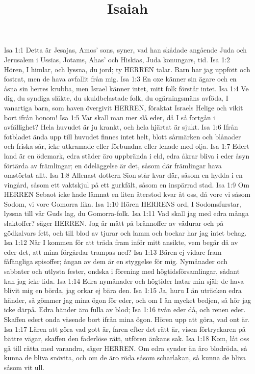 

\title{Isaiah}

Isa 1:1  Detta är Jesajas, Amos' sons, syner, vad han skådade angående Juda och Jerusalem i Ussias, Jotams, Ahas' och Hiskias, Juda konungars, tid.
Isa 1:2  Hören, I himlar, och lyssna, du jord; ty HERREN talar. Barn har jag uppfött och fostrat, men de hava avfallit från mig.
Isa 1:3  En oxe känner sin ägare och en åsna sin herres krubba, men Israel känner intet, mitt folk förstår intet.
Isa 1:4  Ve dig, du syndiga släkte, du skuldbelastade folk, du ogärningsmäns avföda, I vanartiga barn, som haven övergivit HERREN, föraktat Israels Helige och vikit bort ifrån honom!
Isa 1:5  Var skall man mer slå eder, då I så fortgån i avfällighet? Hela huvudet är ju krankt, och hela hjärtat är sjukt.
Isa 1:6  Ifrån fotbladet ända upp till huvudet finnes intet helt, blott sårmärken och blånader och friska sår, icke utkramade eller förbundna eller lenade med olja.
Isa 1:7  Edert land är en ödemark, edra städer äro uppbrända i eld, edra åkrar bliva i eder åsyn förtärda av främlingar; en ödeläggelse är det, såsom där främlingar hava omstörtat allt.
Isa 1:8  Allenast dottern Sion står kvar där, såsom en hydda i en vingård, såsom ett vaktskjul på ett gurkfält, såsom en inspärrad stad.
Isa 1:9  Om HERREN Sebaot icke hade lämnat en liten återstod kvar åt oss, då vore vi såsom Sodom, vi vore Gomorra lika.
Isa 1:10  Hören HERRENS ord, I Sodomsfurstar, lyssna till vår Guds lag, du Gomorra-folk.
Isa 1:11  Vad skall jag med edra många slaktoffer? säger HERREN. Jag är mätt på brännoffer av vädurar och på gödkalvars fett, och till blod av tjurar och lamm och bockar har jag intet behag.
Isa 1:12  När I kommen för att träda fram inför mitt ansikte, vem begär då av eder det, att mina förgårdar trampas ned?
Isa 1:13  Bären ej vidare fram fåfängliga spisoffer; ångan av dem är en styggelse för mig. Nymånader och sabbater och utlysta fester, ondska i förening med högtidsförsamlingar, sådant kan jag icke lida.
Isa 1:14  Edra nymånader och högtider hatar min själ; de hava blivit mig en börda, jag orkar ej bära den.
Isa 1:15  Ja, huru I än uträcken edra händer, så gömmer jag mina ögon för eder, och om I än mycket bedjen, så hör jag icke därpå. Edra händer äro fulla av blod;
Isa 1:16  tvån eder då, och renen eder. Skaffen edert onda väsende bort ifrån mina ögon. Hören upp att göra, vad ont är.
Isa 1:17  Lären att göra vad gott är, faren efter det rätt är, visen förtryckaren på bättre vägar, skaffen den faderlöse rätt, utfören änkans sak.
Isa 1:18  Kom, låt oss gå till rätta med varandra, säger HERREN. Om edra synder än äro blodröda, så kunna de bliva snövita, och om de äro röda såsom scharlakan, så kunna de bliva såsom vit ull.
